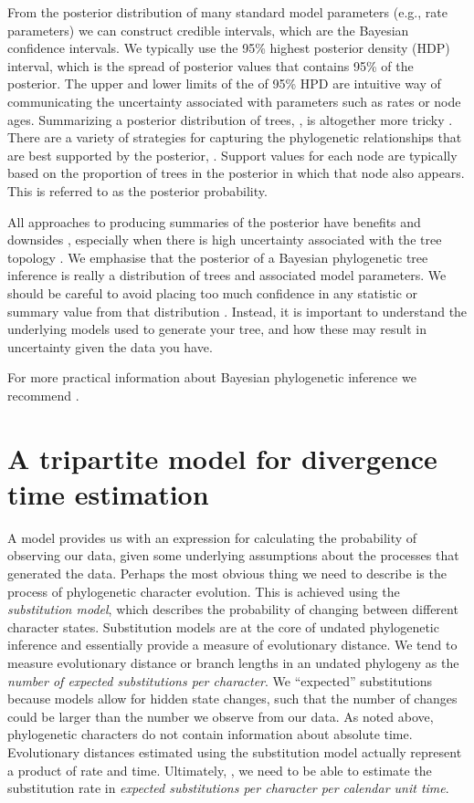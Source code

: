 From the posterior distribution of many standard model parameters (e.g., rate parameters) we can construct credible intervals, which are the Bayesian  confidence intervals.
We typically use the 95\% highest posterior density (HDP) interval, which is the spread of posterior values that contains 95\% of the posterior.
The upper and lower limits of the of 95\% HPD are  intuitive way of communicating the uncertainty associated with parameters such as rates or node ages.
Summarizing a posterior distribution of trees, , is altogether more tricky \citep{heled2013,OReilly2018}.
There are a variety of strategies for capturing the phylogenetic relationships that are best supported by the posterior, .
Support values for each node are typically based on the proportion of trees in the posterior in which that node also appears.
This is referred to as the posterior probability.

All approaches to producing summaries of the posterior have benefits and downsides \citep{heled2013}, especially when there is high uncertainty associated with the tree topology \citep{OReilly2018}.
We emphasise that the posterior of a Bayesian phylogenetic tree inference is really a distribution of trees and associated model parameters.
We should be careful to avoid placing too much confidence in any statistic or summary value from that distribution \citep{Warnock2017}.
Instead, it is important to understand the underlying models used to generate your tree, and how these may result in uncertainty given the data you have.

For more practical information about Bayesian phylogenetic inference we recommend \citet{nascimento2017}.

\section{A tripartite model for divergence time estimation}

A model provides us with an expression for calculating the probability of observing our data, given some underlying assumptions about the processes that generated the data.
Perhaps the most obvious thing we need to describe is the process of phylogenetic character evolution.
This is achieved  using the \textit{substitution model}, which describes the probability of changing between different character states.
Substitution models are at the core of undated phylogenetic inference and essentially provide a measure of evolutionary distance.
We tend to measure evolutionary distance or branch lengths in an undated phylogeny as the \textit{number of expected substitutions per character}. We  ``expected'' substitutions because models allow for hidden state changes, such that the number of changes could be larger than the number we observe from our data.
As noted above, phylogenetic characters do not contain information about absolute time. Evolutionary distances estimated using the substitution model actually represent a product of rate and time.
Ultimately, , we need to be able to estimate the substitution rate in \textit{expected substitutions per character per calendar unit time}.

